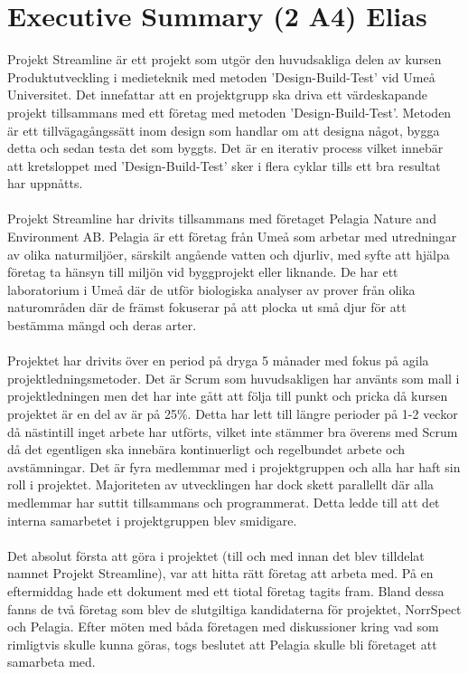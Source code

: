 \section{Executive Summary (2 A4) Elias}
Projekt Streamline är ett projekt som utgör den huvudsakliga delen av kursen Produktutveckling i medieteknik med metoden 'Design-Build-Test' vid Umeå Universitet. Det innefattar att en projektgrupp ska driva ett värdeskapande projekt tillsammans med ett företag med metoden 'Design-Build-Test'. Metoden är ett tillvägagångssätt inom design som handlar om att designa något, bygga detta och sedan testa det som byggts. Det är en iterativ process vilket innebär att kretsloppet med 'Design-Build-Test' sker i flera cyklar tills ett bra resultat har uppnåtts.
\\
\\
Projekt Streamline har drivits tillsammans med företaget Pelagia Nature and Environment AB. Pelagia är ett företag från Umeå som arbetar med utredningar av olika naturmiljöer, särskilt angående vatten och djurliv, med syfte att hjälpa företag ta hänsyn till miljön vid byggprojekt eller liknande. De har ett laboratorium i Umeå där de utför biologiska analyser av prover från olika naturområden där de främst fokuserar på att plocka ut små djur för att bestämma mängd och deras arter.
\\
\\
Projektet har drivits över en period på dryga 5 månader med fokus på agila projektledningsmetoder. Det är Scrum som huvudsakligen har använts som mall i projektledningen men det har inte gått att följa till punkt och pricka då kursen projektet är en del av är på 25\%. Detta har lett till längre perioder på 1-2 veckor då nästintill inget arbete har utförts, vilket inte stämmer bra överens med Scrum då det egentligen ska innebära kontinuerligt och regelbundet arbete och avstämningar. Det är fyra medlemmar med i projektgruppen och alla har haft sin roll i projektet. Majoriteten av utvecklingen har dock skett parallellt där alla medlemmar har suttit tillsammans och programmerat. Detta ledde till att det interna samarbetet i projektgruppen blev smidigare.
\\
\\
Det absolut första att göra i projektet (till och med innan det blev tilldelat namnet Projekt Streamline), var att hitta rätt företag att arbeta med. På en eftermiddag hade ett dokument med ett tiotal företag tagits fram. Bland dessa fanns de två företag som blev de slutgiltiga kandidaterna för projektet, NorrSpect och Pelagia. Efter möten med båda företagen med diskussioner kring vad som rimligtvis skulle kunna göras, togs beslutet att Pelagia skulle bli företaget att samarbeta med. 
